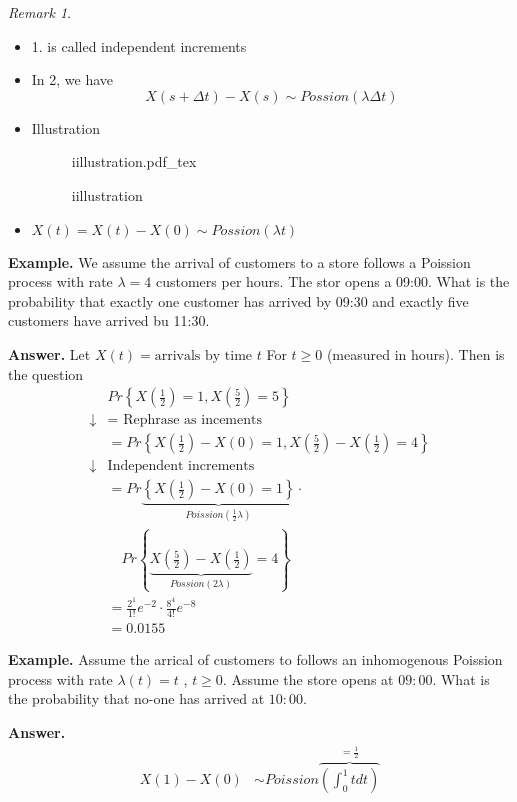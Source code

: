 \documentclass{article}
\newcommand{\incfig}[2][1]{%
\def\svgwidth{#1\columnwidth}
{#2.pdf_tex} } \pdfsuppresswarningpagegroup=1
\theoremstyle{remark}
\newtheorem*{remark}{Remark}
\newcommand{\newpara}
  {
  \vskip 0.4cm
  }
\begin{document}
\begin{remark}
  \begin{itemize}
    \item 1. is called independent increments
    \item In 2, we have \[
        X\left( s+ \Delta t \right) - X\left( s \right) \sim Possion(\lambda  \Delta t)
    \]
  \item Illustration
\begin{figure}[ht]
    \centering
    \incfig{iillustration}
    \caption{iillustration}
    \label{fig:iillustration}
\end{figure}
\item $X\left( t \right) = X\left( t \right) - X\left( 0 \right) \sim Possion(\lambda t)$
  \end{itemize}
\end{remark}
\begin{tcolorbox}
  \textbf{Example.} We assume the arrival of customers to a store follows a Poission process with rate $\lambda  = 4$ customers per hours. The stor opens a 09:00. What is the probability that exactly one customer has arrived by 09:30 and exactly five customers have arrived bu 11:30.

  \newpara
  \textbf{Answer.} Let $X\left( t \right) = \text{arrivals by time } t$ For $t\ge 0$ (measured in hours). Then is the question \[
    \begin{split}
   &  Pr \left \{ X\left( \frac{1}{2} \right) = 1,     X\left( \frac{5}{2}  \right) = 5 \right \}     \\
  \downarrow   &  = \text{ Rephrase as incements } \\
               &= Pr \left \{ X\left( \frac{1}{2} \right) - X\left( 0 \right) = 1 , X\left( \frac{5}{2}  \right) - X\left( \frac{1}{2} \right) = 4  \right \}  \\
               \downarrow  &  \text{Independent increments} \\
                           &= Pr  \underbrace{\left \{ X\left( \frac{1}{2} \right)- X\left( 0 \right) = 1 \right \}}_{ Poission(\frac{1}{2} \lambda )}  \cdot \\
                            & \quad     Pr \left \{  \underbrace{ X\left( \frac{5}{2} \right) - X\left( \frac{1}{2} \right)}_{Possion(2 \lambda )}  = 4 \right\}  \\
&= \frac{2^{1}}{1!} e^{-2}  \cdot \frac{8^{4}}{4!} e^{-8}   \\
    &= 0.0155
    \end{split}
  \]
\end{tcolorbox}
\begin{tcolorbox}
  \textbf{Example.} Assume the arrical of customers to follows an inhomogenous Poission process with rate $\lambda \left( t \right)  =t$ , $t\ge 0 $. Assume the store opens at $09:00$. What is the probability that no-one has arrived at $10:00$.

  \newpara
  \textbf{Answer.} \[
    \begin{split}
  X\left( 1 \right) - X\left( 0 \right)  & \sim Poission\overbrace{\left( \int_{0}^{ 1}  t dt  \right)}^{ = \frac{1}{2}}   \\
    \end{split}
  \]
\end{tcolorbox}
\newpage
\end{document}
